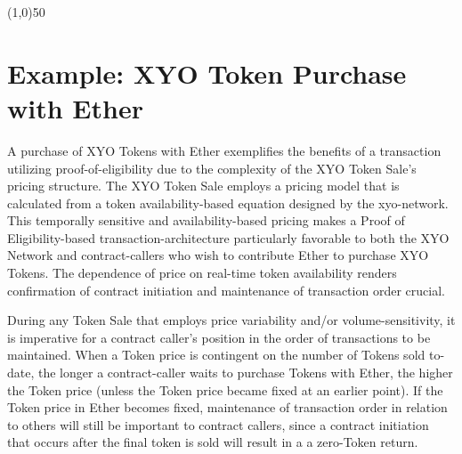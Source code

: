 \documentclass{article}
\begin{document}
\begin{center}
\line(1,0){50}
\end{center}

\section {Example: XYO Token Purchase with Ether}
A purchase of XYO Tokens with Ether exemplifies the benefits of a transaction utilizing \Gls{proof-of-eligibility} due to the complexity of the XYO Token Sale's pricing structure. The XYO Token Sale employs a pricing model that is calculated from a token availability-based equation designed by the \Gls{xyo-network}. This temporally sensitive and availability-based pricing makes a Proof of Eligibility-based \gls{transaction-architecture} particularly favorable to both the XYO Network and \glspl{contract-caller} who wish to contribute Ether to purchase XYO Tokens. The dependence of price on real-time token availability renders confirmation of contract initiation and maintenance of transaction order crucial.

During any Token Sale that employs price variability and/or volume-sensitivity, it is imperative for a contract caller's position in the order of transactions to be maintained. When a Token price is contingent on the number of Tokens sold to-date, the longer a \gls{contract-caller} waits to purchase Tokens with Ether, the higher the Token price (unless the Token price became fixed at an earlier point). If the Token price in Ether becomes fixed, maintenance of transaction order in relation to others will still be important to contract callers, since a contract initiation that occurs after the final token is sold will result in a a zero-Token return.

\vfill
\end{document}
